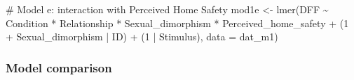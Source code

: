 \documentclass[
  bookmarksnumbered]{article}
\newenvironment{Shaded}{\begin{snugshade}}{\end{snugshade}}
\newcommand{\AttributeTok}[1]{\textcolor[rgb]{0.80,0.80,0.80}{#1}}
\newcommand{\CommentTok}[1]{\textcolor[rgb]{0.50,0.62,0.50}{#1}}
\newcommand{\DecValTok}[1]{\textcolor[rgb]{0.86,0.86,0.80}{#1}}
\newcommand{\FunctionTok}[1]{\textcolor[rgb]{0.94,0.94,0.56}{#1}}
\newcommand{\NormalTok}[1]{\textcolor[rgb]{0.80,0.80,0.80}{#1}}
\newcommand{\OtherTok}[1]{\textcolor[rgb]{0.94,0.94,0.56}{#1}}
\newcommand{\SpecialCharTok}[1]{\textcolor[rgb]{0.86,0.64,0.64}{#1}}
\newcommand{\StringTok}[1]{\textcolor[rgb]{0.80,0.58,0.58}{#1}}
\begin{document}
\begin{Shaded}
\begin{Highlighting}[]
\CommentTok{\# Model e: interaction with Perceived Home Safety}
\NormalTok{mod1e }\OtherTok{\textless{}{-}} \FunctionTok{lmer}\NormalTok{(DFF }\SpecialCharTok{\textasciitilde{}}
\NormalTok{                Condition }\SpecialCharTok{*}\NormalTok{ Relationship }\SpecialCharTok{*}\NormalTok{ Sexual\_dimorphism }\SpecialCharTok{*}\NormalTok{ Perceived\_home\_safety }\SpecialCharTok{+}
\NormalTok{                (}\DecValTok{1} \SpecialCharTok{+}\NormalTok{ Sexual\_dimorphism }\SpecialCharTok{|}\NormalTok{ ID) }\SpecialCharTok{+}\NormalTok{ (}\DecValTok{1} \SpecialCharTok{|}\NormalTok{ Stimulus), }
              \AttributeTok{data =}\NormalTok{ dat\_m1)}
\end{Highlighting}
\end{Shaded}

\subsubsection{Model comparison}\label{model-comparison}

\begin{Shaded}
\end{Shaded}
\end{document}

